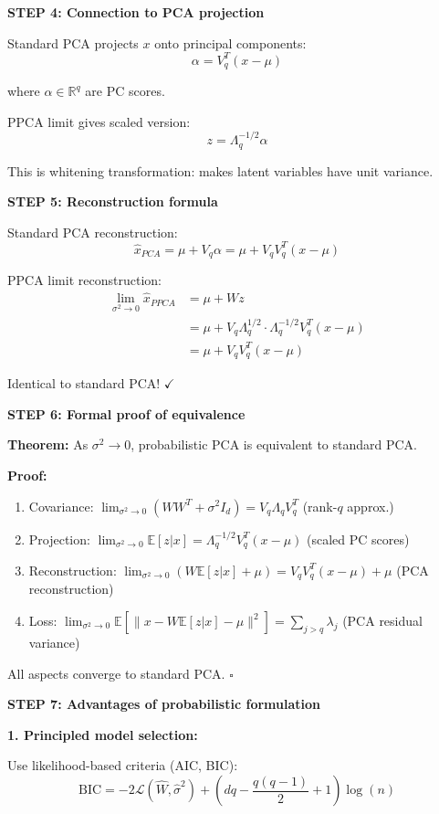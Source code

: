\documentclass[12pt]{article}
\begin{document}
\begin{solution}
\textbf{STEP 4: Connection to PCA projection}

Standard PCA projects $x$ onto principal components:
\[
\alpha = V_q^T(x - \mu)
\]

where $\alpha \in \mathbb{R}^q$ are PC scores.

PPCA limit gives scaled version:
\[
z = \Lambda_q^{-1/2}\alpha
\]

This is whitening transformation: makes latent variables have unit variance.

\textbf{STEP 5: Reconstruction formula}

Standard PCA reconstruction:
\[
\hat{x}_{PCA} = \mu + V_q\alpha = \mu + V_qV_q^T(x - \mu)
\]

PPCA limit reconstruction:
\begin{align*}
\lim_{\sigma^2 \to 0}\hat{x}_{PPCA} &= \mu + Wz \\
&= \mu + V_q\Lambda_q^{1/2} \cdot \Lambda_q^{-1/2}V_q^T(x - \mu) \\
&= \mu + V_qV_q^T(x - \mu)
\end{align*}

Identical to standard PCA! $\checkmark$

\textbf{STEP 6: Formal proof of equivalence}

\textbf{Theorem:} As $\sigma^2 \to 0$, probabilistic PCA is equivalent to standard PCA.

\textbf{Proof:}
\begin{enumerate}
    \item Covariance: $\lim_{\sigma^2 \to 0}(WW^T + \sigma^2 I_d) = V_q\Lambda_qV_q^T$ (rank-$q$ approx.)
    \item Projection: $\lim_{\sigma^2 \to 0}\mathbb{E}[z|x] = \Lambda_q^{-1/2}V_q^T(x - \mu)$ (scaled PC scores)
    \item Reconstruction: $\lim_{\sigma^2 \to 0}(W\mathbb{E}[z|x] + \mu) = V_qV_q^T(x - \mu) + \mu$ (PCA reconstruction)
    \item Loss: $\lim_{\sigma^2 \to 0}\mathbb{E}[\|x - W\mathbb{E}[z|x] - \mu\|^2] = \sum_{j>q}\lambda_j$ (PCA residual variance)
\end{enumerate}

All aspects converge to standard PCA. $\square$

\textbf{STEP 7: Advantages of probabilistic formulation}

\textbf{1. Principled model selection:}

Use likelihood-based criteria (AIC, BIC):
\[
\text{BIC} = -2\mathcal{L}(\hat{W}, \hat{\sigma}^2) + (dq - \frac{q(q-1)}{2} + 1)\log(n)
\]


\end{solution}
\end{document}
